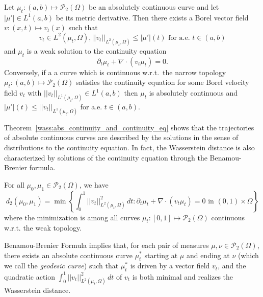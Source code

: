 \begin{theorem}\label{wass:abs_continuity_and_continuity_eq}
    Let $\mu_t : (a,b) \mapsto \mathcal{P}_2(\Omega)$ be an absolutely continuous
    curve and let $|\mu'| \in L^1(a,b)$ be its metric derivative.
    Then there exists a Borel vector field $v : (x,t) \mapsto v_t(x)$ such that
    \begin{equation}
        v_t \in L^2(\mu_t, \Omega), ||v_t||_{L^2(\mu_t, \Omega)} \leq |\mu'|(t)\text{ for a.e. } t \in (a,b)
    \end{equation}
    and $\mu_t$ is a weak solution to the continuity equation
    \begin{equation}
        \partial_t \mu_t + \nabla \cdot (v_t \mu_t) = 0.
    \end{equation}
    Conversely, if a a curve which is continuous w.r.t.~the narrow topology
    $\mu_t : (a,b) \mapsto \mathcal{P}_2(\Omega)$
    satisfies the continuity equation for some Borel velocity field $v_t$ with
    $||v_t||_{L^1(\mu_t, \Omega)} \in L^1(a,b)$ then $\mu_t$ is absolutely continuous
    and $ |\mu'|(t) \leq  ||v_t||_{L^1(\mu_t, \Omega)}$ for a.e. $t \in (a,b)$.
\end{theorem}

Theorem~\ref{wass:abs_continuity_and_continuity_eq} shows that the trajectories of absolute continuous curves are described
by the solutions in the sense of distributions to the continuity equation. In fact, the Wasserstein distance is also characterized
by solutions of the continuity equation through the Benamou-Brenier formula.

\begin{theorem}
    For all  $\mu_0, \mu_1 \in \mathcal{P}_2(\Omega)$, we have
    \begin{equation}
        d_2(\mu_0, \mu_1) = \min \left\{ \int_0^1 ||v_t||^2_{L^2(\mu_t, \Omega)} \, dt : \partial_t \mu_t + \nabla \cdot (v_t \mu_t) = 0 \text{ in } (0,1) \times \Omega \right\}
    \end{equation} 
    where the minimization is among all curves $\mu_t : [0,1] \mapsto \mathcal{P}_2(\Omega)$
    continuous w.r.t. the weak topology.
\end{theorem}

Benamou-Brenier Formula implies that,
for each pair of measures $\mu, \nu \in \mathcal{P}_2(\Omega)$,
there exists an absolute continuous curve $\mu^*_t$ starting at $\mu$ and ending at $\nu$ 
(which we call the \textit{geodesic curve})
such that $\mu^*_t$ is driven by a vector field $v_t$, and the quadratic action
$\int_0^1 ||v_t||^2_{L^2(\mu_t, \Omega)} \, dt$ of $v_t$
is both minimal and realizes the Wasserstein distance.

